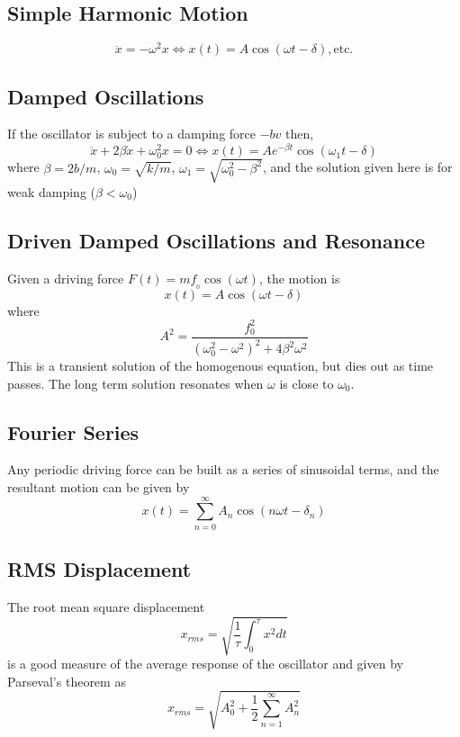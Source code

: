 \documentclass{article}
\begin{document}
\subsection{Simple Harmonic Motion}
$$
\ddot{x} = -\omega^2 x \iff x(t) = A\cos(\omega t - \delta), \text{etc.}
$$
\subsection{Damped Oscillations}
If the oscillator is subject to a damping force $-bv$ then,
$$
\ddot{x} + 2\beta \dot{x} + \omega_0^2 x = 0 \iff x(t) = Ae^{-\beta t} \cos(\omega_1 t-\delta)
$$
where $\beta = 2b/m$, $\omega_0 = \sqrt{k/m}$, $\omega_1 = \sqrt{\omega_0^2 - \beta^2}$, and the solution given here is for weak damping ($\beta < \omega_0$)
\subsection{Driven Damped Oscillations and Resonance}
Given a driving force $F(t) = mf__0\cos(\omega t)$, the motion is 
$$
x(t) = A\cos(\omega t - \delta)
$$
where 
$$
A^2 = \frac{f_0^2}{(\omega_0^2 - \omega^2)^2 + 4\beta^2\omega^2}
$$
This is a transient solution of the homogenous equation, but dies out as time passes.  The long term solution resonates when $\omega$ is close to $\omega_0$.
\subsection{Fourier Series}
Any periodic driving force can be built as a series of sinusoidal terms, and the resultant motion can be given by 
$$
x(t) = \sum_{n=0}^\infty A_n\cos(n\omega t - \delta_n)
$$
\subsection{RMS Displacement}
The root mean square displacement 
$$
x_{rms} = \sqrt{\frac{1}{\tau} \int_0^\tau x^2 dt}
$$
is a good measure of the average response of the oscillator and given by Parseval's theorem as
$$
x_{rms} = \sqrt{A_0^2 + \frac{1}{2}\sum_{n=1}^\infty A_n^2}
$$
\end{document}
